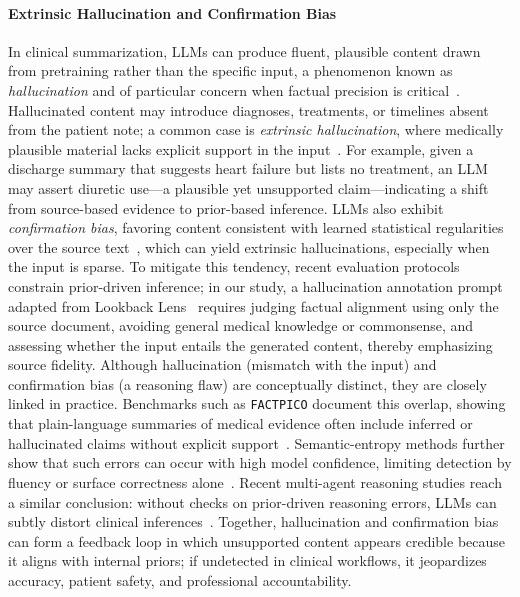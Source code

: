 \documentclass{article}
\begin{document}
\paragraph{Extrinsic Hallucination and Confirmation Bias}
In clinical summarization, LLMs can produce fluent, plausible content drawn from pretraining rather than the specific input, a phenomenon known as \textit{hallucination} and of particular concern when factual precision is critical~\citep{asgari2025framework,huang2025survey}. Hallucinated content may introduce diagnoses, treatments, or timelines absent from the patient note; a common case is \textit{extrinsic hallucination}, where medically plausible material lacks explicit support in the input~\citep{huang2025survey,mckenna2023sources}. For example, given a discharge summary that suggests heart failure but lists no treatment, an LLM may assert diuretic use—a plausible yet unsupported claim—indicating a shift from source-based evidence to prior-based inference. LLMs also exhibit \textit{confirmation bias}, favoring content consistent with learned statistical regularities over the source text~\citep{schmidgall2024addressing}, which can yield extrinsic hallucinations, especially when the input is sparse. To mitigate this tendency, recent evaluation protocols constrain prior-driven inference; in our study, a hallucination annotation prompt adapted from Lookback Lens~\citep{chuang2024lookback} requires judging factual alignment using only the source document, avoiding general medical knowledge or commonsense, and assessing whether the input entails the generated content, thereby emphasizing source fidelity. Although hallucination (mismatch with the input) and confirmation bias (a reasoning flaw) are conceptually distinct, they are closely linked in practice. Benchmarks such as \texttt{FACTPICO} document this overlap, showing that plain-language summaries of medical evidence often include inferred or hallucinated claims without explicit support~\citep{joseph2024factpico}. Semantic-entropy methods further show that such errors can occur with high model confidence, limiting detection by fluency or surface correctness alone~\citep{farquhar2024detecting}. Recent multi-agent reasoning studies reach a similar conclusion: without checks on prior-driven reasoning errors, LLMs can subtly distort clinical inferences~\citep{ke2024enhancing}. Together, hallucination and confirmation bias can form a feedback loop in which unsupported content appears credible because it aligns with internal priors; if undetected in clinical workflows, it jeopardizes accuracy, patient safety, and professional accountability.
\end{document}

